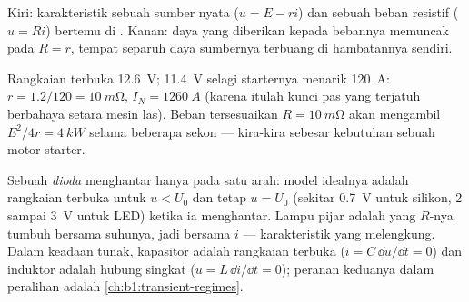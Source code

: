 \begin{omfigure}
\qquad
{}

{\small Kiri: karakteristik sebuah sumber nyata ($u = E - ri$) dan
sebuah beban resistif ($u = Ri$) bertemu di . Kanan: daya
yang diberikan kepada bebannya memuncak pada $R = r$, tempat separuh
daya sumbernya terbuang di hambatannya sendiri.}
\end{omfigure}

\begin{example}\label{ex:b1:dc-circuits:battery}
Rangkaian terbuka \qty{12.6}{V}; \qty{11.4}{V} selagi starternya menarik
\qty{120}{A}: $r = 1.2/120 = \qty{10}{m\ohm}$, $I_N = \qty{1260}{A}$
(karena itulah kunci pas yang terjatuh berbahaya setara mesin las).
Beban tersesuaikan $R = \qty{10}{m\ohm}$ akan mengambil
$E^2/4r = \qty{4}{kW}$ selama beberapa sekon --- kira-kira sebesar
kebutuhan sebuah motor starter.
\end{example}

\begin{remark}\label{rem:b1:dc-circuits:others}
Sebuah \emph{dioda} menghantar hanya pada satu arah: model idealnya
adalah rangkaian terbuka untuk $u < U_0$ dan  tetap $u = U_0$
(sekitar \qty{0.7}{V} untuk silikon, \qty{2}{} sampai \qty{3}{V} untuk
LED) ketika ia menghantar. Lampu pijar adalah  yang $R$-nya
tumbuh bersama suhunya, jadi bersama $i$ --- karakteristik yang
melengkung. Dalam keadaan tunak, kapasitor adalah rangkaian terbuka
($i = C\,\dd u/\dd t = 0$) dan induktor adalah hubung singkat
($u = L\,\dd i/\dd t = 0$); peranan keduanya dalam peralihan adalah
\cref{ch:b1:transient-regimes}.
\end{remark}

